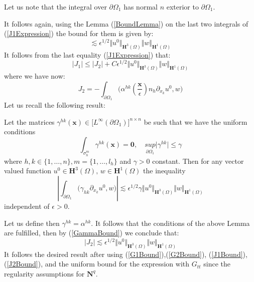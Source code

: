 \begin{rem}
Let us note that the integral over $\partial \Omega_1$ has normal $n$ exterior to $\partial \Omega_1$.
\end{rem}
It follows again, using the Lemma (\ref{BoundLemma}) on the last two integrals of (\ref{J1Expression}) the bound for them is given by:
\begin{equation*}
    \lesssim \epsilon^{1/2} \Vert u^0 \Vert_{\mathbf{H}^3(\Omega)} \Vert w \Vert_{\mathbf{H}^1(\Omega)}
\end{equation*}
It follows from the last equality (\ref{J1Expression}) that:
\begin{equation}
    \label{J1Bound}
    \vert J_1 \vert \leq \vert J_2 \vert + C \epsilon^{1/2} \Vert u^0 \Vert_{\mathbf{H}^3(\Omega)} \Vert w \Vert_{\mathbf{H}^1(\Omega)}
\end{equation}
where we have now:
\begin{equation}
    \label{J2Expression}
    J_2 = - \int_{\partial \Omega_1} \big( \alpha^{hk}(\frac{\mathbf{x}}{\epsilon}) n_h \partial_{x_k} u^0, w\big)
\end{equation}
Let us recall the following result:
\begin{lem}
Let the matrices $\gamma^{hk}(\mathbf{x})\in \big[L^{\infty}(\partial \Omega_1)\big]^{n\times n}$ be such that we have the uniform conditions
\begin{equation}
    \int_{\sigma_h^m} \gamma^{hk}(\mathbf{x}) = \mathbf{0}, \quad \underset{\partial \Omega_1}{sup} \vert \gamma^{hk} \vert \leq \gamma
\end{equation}
where $h,k \in \{1,\dots,n\}, m = \{1,\dots,l_h\}$ and $\gamma  > 0$ constant. Then for any vector valued function $u^0 \in \mathbf{H}^3(\Omega), \, w \in \mathbf{H}^1(\Omega)$ the inequality
\begin{equation}
    \label{GammaBound}
    \left \vert \int_{\partial \Omega_1} \big(\gamma_{hk} \partial_{x_k} u^0, w \big) \right \vert \lesssim \epsilon^{1/2} \gamma \Vert u^0 \Vert_{\mathbf{H}^3(\Omega)} \Vert w \Vert_{\mathbf{H}^1(\Omega)}
\end{equation}
independent of $\epsilon > 0$.
\end{lem}
Let us define then $\gamma^{hk} = \alpha^{hk}$. It follows that the conditions of the above Lemma are fulfilled, then by  (\ref{GammaBound}) we conclude that:
\begin{equation}
    \label{J2Bound}
    \vert J_2 \vert \lesssim \epsilon^{1/2} \Vert u^0 \Vert_{\mathbf{H}^3(\Omega)} \Vert w \Vert_{\mathbf{H}^1(\Omega)}
\end{equation}
It follows the desired result after using (\ref{G1Bound}),(\ref{G2Bound}), (\ref{J1Bound}), (\ref{J2Bound}), and the uniform bound for the expression with $G_{tt}$ since the regularity assumptions for $\mathbf{N}^q$.

